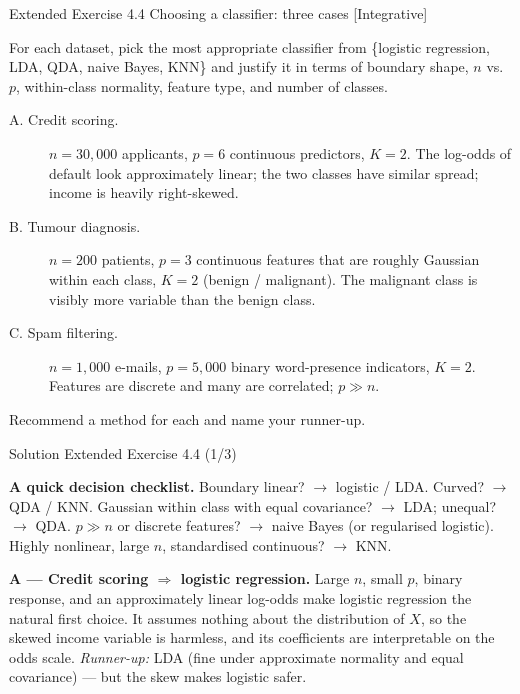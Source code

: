 \documentclass[aspectratio=169,11pt]{beamer}
\begin{document}
\begin{frame}{Extended Exercise 4.4 \textemdash{} Choosing a classifier: three cases [Integrative]}
\begin{longexercise}
For each dataset, pick the most appropriate classifier from
\{logistic regression, LDA, QDA, naive Bayes, KNN\} and justify it in
terms of boundary shape, $n$ vs.\ $p$, within-class normality, feature
type, and number of classes.
\begin{description}
  \item[A. Credit scoring.] $n=30{,}000$ applicants, $p=6$ continuous
        predictors, $K=2$. The log-odds of default look approximately
        linear; the two classes have similar spread; income is heavily
        right-skewed.
  \item[B. Tumour diagnosis.] $n=200$ patients, $p=3$ continuous features
        that are roughly Gaussian within each class, $K=2$
        (benign / malignant). The malignant class is visibly more
        variable than the benign class.
  \item[C. Spam filtering.] $n=1{,}000$ e-mails, $p=5{,}000$ binary
        word-presence indicators, $K=2$. Features are discrete and many
        are correlated; $p\gg n$.
\end{description}
Recommend a method for each and name your runner-up.
\end{longexercise}
\end{frame}

\begin{frame}{Solution \textemdash{} Extended Exercise 4.4 (1/3)}
\begin{solutionbox}
\textbf{A quick decision checklist.}
Boundary linear? $\to$ logistic / LDA. Curved? $\to$ QDA / KNN.
Gaussian within class with equal covariance? $\to$ LDA; unequal? $\to$
QDA. $p\gg n$ or discrete features? $\to$ naive Bayes (or regularised
logistic). Highly nonlinear, large $n$, standardised continuous? $\to$
KNN.

\vspace{1mm}
\textbf{A --- Credit scoring $\Rightarrow$ logistic regression.}
Large $n$, small $p$, binary response, and an approximately linear
log-odds make logistic regression the natural first choice. It assumes
nothing about the distribution of $X$, so the skewed income variable is
harmless, and its coefficients are interpretable on the odds scale.
\emph{Runner-up:} LDA (fine under approximate normality and equal
covariance) --- but the skew makes logistic safer.
\end{solutionbox}
\end{frame}
\end{document}
